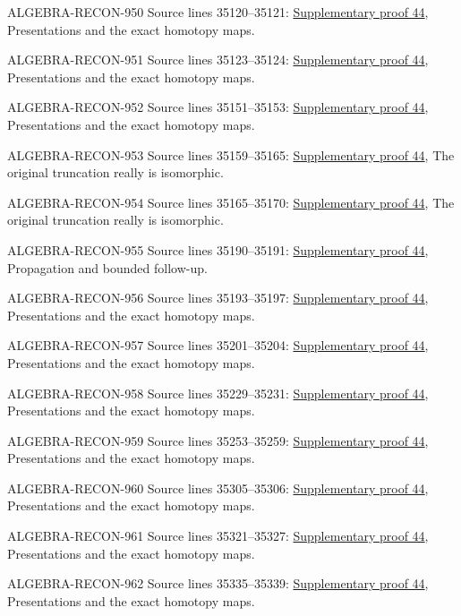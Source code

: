 \begin{AlgebraSourceRoutes}
\item[ALGEBRA-RECON-950] Source lines 35120--35121: \hyperlink{algebra_naive_cotangent_notes_20260928}{Supplementary proof 44}, Presentations and the exact homotopy maps.
\item[ALGEBRA-RECON-951] Source lines 35123--35124: \hyperlink{algebra_naive_cotangent_notes_20260928}{Supplementary proof 44}, Presentations and the exact homotopy maps.
\item[ALGEBRA-RECON-952] Source lines 35151--35153: \hyperlink{algebra_naive_cotangent_notes_20260928}{Supplementary proof 44}, Presentations and the exact homotopy maps.
\item[ALGEBRA-RECON-953] Source lines 35159--35165: \hyperlink{algebra_naive_cotangent_notes_20260928}{Supplementary proof 44}, The original truncation really is isomorphic.
\item[ALGEBRA-RECON-954] Source lines 35165--35170: \hyperlink{algebra_naive_cotangent_notes_20260928}{Supplementary proof 44}, The original truncation really is isomorphic.
\item[ALGEBRA-RECON-955] Source lines 35190--35191: \hyperlink{algebra_naive_cotangent_notes_20260928}{Supplementary proof 44}, Propagation and bounded follow-up.
\item[ALGEBRA-RECON-956] Source lines 35193--35197: \hyperlink{algebra_naive_cotangent_notes_20260928}{Supplementary proof 44}, Presentations and the exact homotopy maps.
\item[ALGEBRA-RECON-957] Source lines 35201--35204: \hyperlink{algebra_naive_cotangent_notes_20260928}{Supplementary proof 44}, Presentations and the exact homotopy maps.
\item[ALGEBRA-RECON-958] Source lines 35229--35231: \hyperlink{algebra_naive_cotangent_notes_20260928}{Supplementary proof 44}, Presentations and the exact homotopy maps.
\item[ALGEBRA-RECON-959] Source lines 35253--35259: \hyperlink{algebra_naive_cotangent_notes_20260928}{Supplementary proof 44}, Presentations and the exact homotopy maps.
\item[ALGEBRA-RECON-960] Source lines 35305--35306: \hyperlink{algebra_naive_cotangent_notes_20260928}{Supplementary proof 44}, Presentations and the exact homotopy maps.
\item[ALGEBRA-RECON-961] Source lines 35321--35327: \hyperlink{algebra_naive_cotangent_notes_20260928}{Supplementary proof 44}, Presentations and the exact homotopy maps.
\item[ALGEBRA-RECON-962] Source lines 35335--35339: \hyperlink{algebra_naive_cotangent_notes_20260928}{Supplementary proof 44}, Presentations and the exact homotopy maps.

\end{AlgebraSourceRoutes}
